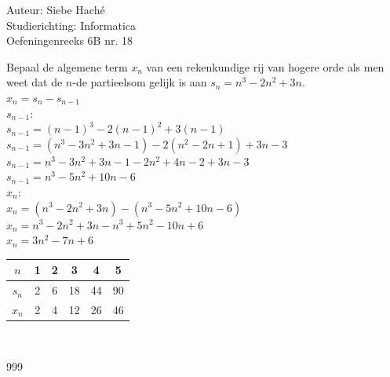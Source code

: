 \documentclass[a4paper]{article}
\begin{document}
\noindent \large Auteur: Siebe Haché \\
\noindent \large Studierichting: Informatica \\
\noindent \large Oefeningenreeks 6B nr. 18 \\

\medskip
\normalsize

Bepaal de algemene term $x_n$ van een rekenkundige rij van hogere orde als men weet dat de $n$-de partieelsom gelijk is aan $s_n = n^3 - 2n^2 + 3n$. \\

$x_n = s_n - s_{n-1}$ \\

$s_{n-1}$: \\

$s_{n-1} = (n-1)^3 - 2(n-1)^2 + 3(n-1)$ \\

$s_{n-1} = (n^3 - 3n^2 + 3n - 1) - 2(n^2 - 2n + 1) + 3n - 3$ \\

$s_{n-1} = n^3 - 3n^2 + 3n - 1 - 2n^2 + 4n - 2 + 3n - 3$ \\

$s_{n-1} = n^3 - 5n^2 + 10n - 6$ \\

$x_n$: \\

$x_n = (n^3 - 2n^2 + 3n) - (n^3 - 5n^2 + 10n - 6)$ \\

$x_n = n^3 - 2n^2 + 3n - n^3 + 5n^2 - 10n + 6$ \\

$x_n = 3n^2 - 7n + 6$ \\

\begin{tabular}{|c|c|c|c|c|c|}
\hline 
$n$ & 1 & 2 & 3 & 4 & 5 \\
\hline 
$s_n$ & 2 & 6 & 18 & 44 & 90 \\
\hline 
$x_n$ & 2 & 4 & 12 & 26 & 46 \\
\hline 
\end{tabular} \\

\begin{thebibliography}{999}
\end{thebibliography}
\end{document}
